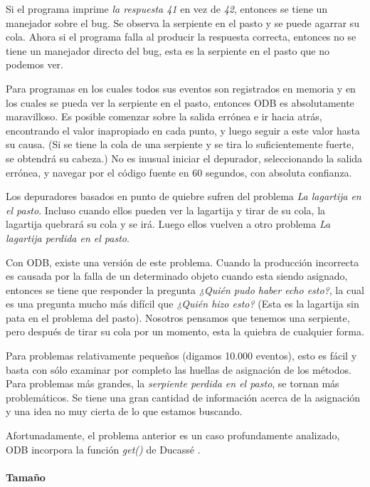 \documentclass[12pt,legalpaper]{report}
\begin{document}
Si el programa imprime \textit{la respuesta 41} en vez de \textit{42}, entonces se tiene un manejador sobre el bug.  Se observa la serpiente en el pasto y se puede agarrar su cola.  Ahora si el programa falla al producir la respuesta correcta, entonces no se tiene un manejador directo del bug, esta es la serpiente en el pasto que no podemos ver.

Para programas en los cuales todos sus eventos son registrados en memoria y en los cuales se pueda ver la serpiente en el pasto, entonces ODB es absolutamente maravilloso.  Es posible comenzar sobre la salida errónea e ir hacia atrás, encontrando el valor inapropiado en cada punto, y luego seguir a este valor hasta su causa. (Si se tiene la cola de una serpiente y se tira lo suficientemente fuerte, se obtendrá su cabeza.)  No es inusual iniciar el depurador, seleccionando la salida errónea, y navegar por el código fuente en 60 segundos, con absoluta confianza.

Los depuradores basados en punto de quiebre sufren del problema \textit{La lagartija en el pasto}.  Incluso cuando ellos pueden ver la lagartija y tirar de su cola, la lagartija quebrará su cola y se irá.  Luego ellos vuelven a otro problema \textit{La lagartija perdida en el pasto}.

Con ODB, existe una versión de este problema.  Cuando la producción incorrecta es causada por la falla de un determinado objeto cuando esta siendo asignado, entonces se tiene que responder la pregunta \textit{¿Quién pudo haber echo esto?}, la cual es una pregunta mucho más difícil que \textit{¿Quién hizo esto?} (Esta es la lagartija sin pata en el problema del pasto).  Nosotros pensamos que tenemos una serpiente, pero después de tirar su cola por un momento, esta la quiebra de cualquier forma.

Para problemas relativamente pequeños (digamos 10.000 eventos), esto es fácil y basta con sólo examinar por completo las huellas de asignación de los métodos.  Para problemas más grandes, la \textit{serpiente perdida en el pasto}, se tornan más problemáticos.  Se tiene una gran cantidad de información acerca de la asignación y una idea no muy cierta de lo que estamos buscando.

Afortunadamente, el problema anterior es un caso profundamente analizado, ODB incorpora la función \textit{get()} de Ducassé \cite{ducasse}.

				\paragraph{Tamaño}
\end{document}
